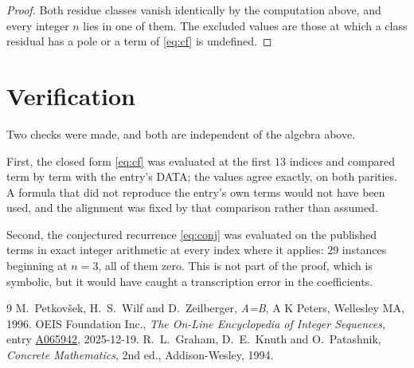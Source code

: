 \documentclass[11pt,a4paper]{article}
\theoremstyle{plain}
\theoremstyle{definition}
\begin{document}
\begin{proof}
Both residue classes vanish identically by the computation above, and every integer $n$
lies in one of them. The excluded values are those at which a class residual has a pole or
a term of \eqref{eq:cf} is undefined.
\end{proof}

\section{Verification}

Two checks were made, and both are independent of the algebra above.

First, the closed form \eqref{eq:cf} was evaluated at the first $13$ indices and
compared term by term with the entry's DATA; the values agree exactly, on both parities. A
formula that did not reproduce the entry's own terms would not have been used, and the
alignment was fixed by that comparison rather than assumed.

Second, the conjectured recurrence \eqref{eq:conj} was evaluated on the published terms in
exact integer arithmetic at every index where it applies: $29$ instances beginning at
$n=3$, all of them zero. This is not part of the proof, which is symbolic, but it
would have caught a transcription error in the coefficients.

\begin{thebibliography}{9}
 M.~Petkov\v{s}ek, H.~S.~Wilf and D.~Zeilberger, \emph{A=B}, A K Peters,
Wellesley MA, 1996.
 OEIS Foundation Inc., \emph{The On-Line Encyclopedia of Integer Sequences},
entry \href{https://oeis.org/A065942}{A065942}, 2025-12-19.
 R.~L.~Graham, D.~E.~Knuth and O.~Patashnik, \emph{Concrete Mathematics},
2nd ed., Addison-Wesley, 1994.
\end{thebibliography}
\end{document}
